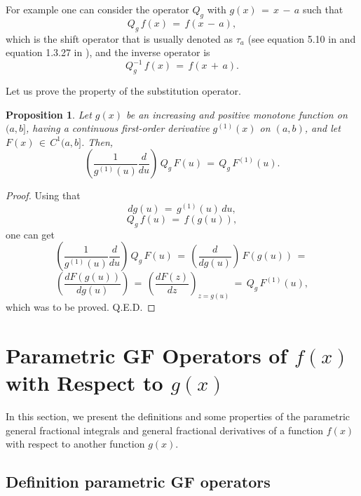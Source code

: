 \documentclass[12pt]{article}
\newtheorem{Proposition}{Proposition}
\begin{document}
For example one can consider the operator $Q_g$ 
with $g(x) \, = \, x \, - \, a$ such that
\[
Q_g \, f(x) \, = \, f(x \, - \, a) ,
\]
which is the shift operator that is usually denoted as $\tau_a$ 
(see equation 5.10 in \cite{SKM} and equation 1.3.27 in \cite{KST}), and the inverse operator is
\[
Q^{-1}_g \, f(x) \, = \, f(x \, + \, a) .
\]


Let us prove the property of the substitution operator.

\begin{Proposition} \label{Property-Q}
Let $g(x)$ be an increasing and positive monotone function on $(a, b]$, having a continuous first-order derivative $g^{(1)}(x)$ on $(a, b)$, and let $F(x) \, \in \, C^1(a,b]$.
Then,
\begin{equation} \label{Property-DQ-QD}
\left( \frac{1}{g^{(1)}(u)} \frac{d}{du} \right) \, Q_{g} \, F(u) \, = \, 
Q_g \, F^{(1)}(u) .
\end{equation}
\end{Proposition} 

\begin{proof}
Using that
\[
dg(u) \, = \, g^{(1)}(u) \, du ,
\]
\[
Q_g \, f(u) \, = \, f(g(u)) ,
\]
one can get
\[
\left( \frac{1}{g^{(1)}(u)} \frac{d}{du} \right) \, Q_{g} \, F(u) \, = \, 
\left( \frac{d}{dg(u)} \right) \, F(g(u)) \, = \, 
\]
\[
\left( \frac{dF(g(u))}{dg(u)} \right) \, = \, 
\left( \frac{dF(z)}{dz} \right)_{z=g(u)} \, = \, 
Q_g \, F^{(1)}(u) ,
\]
which was to be proved. Q.E.D.
\end{proof}





\section{Parametric GF Operators of $f(x)$ with Respect to $g(x)$}

In this section, we present the definitions and some properties of the parametric general fractional integrals and 
general fractional derivatives of a function $f(x)$ with respect to another function $g(x)$.


\subsection{Definition parametric GF operators}
\end{document}
